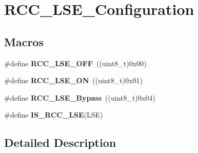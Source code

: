 \hypertarget{group___r_c_c___l_s_e___configuration}{\section{R\-C\-C\-\_\-\-L\-S\-E\-\_\-\-Configuration}
\label{group___r_c_c___l_s_e___configuration}
}
\subsection*{Macros}
\begin{DoxyCompactItemize}
\item 
\hypertarget{group___r_c_c___l_s_e___configuration_ga6645c27708d0cad1a4ab61d2abb24c77}{\#define {\bfseries R\-C\-C\-\_\-\-L\-S\-E\-\_\-\-O\-F\-F}~((uint8\-\_\-t)0x00)}\label{group___r_c_c___l_s_e___configuration_ga6645c27708d0cad1a4ab61d2abb24c77}

\item 
\hypertarget{group___r_c_c___l_s_e___configuration_gac981ea636c2f215e4473901e0912f55a}{\#define {\bfseries R\-C\-C\-\_\-\-L\-S\-E\-\_\-\-O\-N}~((uint8\-\_\-t)0x01)}\label{group___r_c_c___l_s_e___configuration_gac981ea636c2f215e4473901e0912f55a}

\item 
\hypertarget{group___r_c_c___l_s_e___configuration_gac911af00bffa1bd1b1676f582a8a88e1}{\#define {\bfseries R\-C\-C\-\_\-\-L\-S\-E\-\_\-\-Bypass}~((uint8\-\_\-t)0x04)}\label{group___r_c_c___l_s_e___configuration_gac911af00bffa1bd1b1676f582a8a88e1}

\item 
\#define {\bfseries I\-S\-\_\-\-R\-C\-C\-\_\-\-L\-S\-E}(L\-S\-E)
\end{DoxyCompactItemize}


\subsection{Detailed Description}


